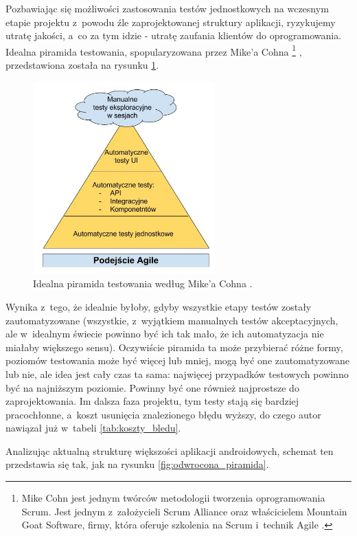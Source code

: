 Pozbawiając się możliwości zastosowania testów jednostkowych na wczesnym etapie projektu z~powodu źle zaprojektowanej struktury aplikacji, ryzykujemy utratę jakości, a~co za tym idzie - utratę zaufania klientów do oprogramowania. Idealna piramida testowania, spopularyzowana przez Mike’a Cohna \footnote{Mike Cohn jest jednym twórców metodologii tworzenia oprogramowania Scrum. Jest jednym z~założycieli Scrum Alliance oraz właścicielem Mountain Goat Software, firmy, która oferuje szkolenia na Scrum i~technik Agile \cite{website:wikipedia}.} \cite{bib:cohn:agile}, przedstawiona została na rysunku \ref{fig:idealna_piramida}.

\begin{figure}[!htb]
    \centering
    \includegraphics[width=7cm]{imgs/ch3_idealna_piramida.jpg}
    \caption
{Idealna piramida testowania według Mike'a Cohna \cite{bib:cohn:agile}.}
    \label{fig:idealna_piramida}
\end{figure} 

\newpage
Wynika z~tego, że idealnie byłoby, gdyby wszystkie etapy testów zostały zautomatyzowane (wszystkie, z~wyjątkiem manualnych testów akceptacyjnych, ale w~idealnym świecie powinno być ich tak mało, że ich automatyzacja nie miałaby większego sensu). Oczywiście piramida ta może przybierać różne formy, poziomów testowania może być więcej lub mniej, mogą być one zautomatyzowane lub nie, ale idea jest cały czas ta sama: najwięcej przypadków testowych powinno być na najniższym poziomie. Powinny być one również najprostsze do zaprojektowania. Im dalsza faza projektu, tym testy stają się bardziej pracochłonne, a~koszt usunięcia znalezionego błędu wyższy, do czego autor nawiązał już w~tabeli \ref{tab:koszty_bledu}.

Analizując aktualną strukturę większości aplikacji androidowych, schemat ten przedstawia się tak, jak na rysunku \ref{fig:odwrocona_piramida}.

